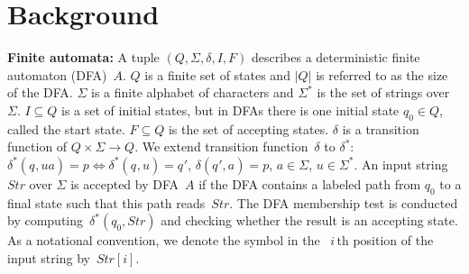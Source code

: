 \documentclass[10pt, conference, compsocconf]{IEEEtran}
\newcommand\STR{\textit{Str}}
\newcommand\State[1][{}]{\ensuremath{q_{#1}}}
\newcommand\StateSets{\ensuremath{Q}}
\newcommand\StartState{\ensuremath{\State[0]}}
\newcommand\NrStates{\ensuremath{\lvert\StateSets\rvert}}
\newcommand\TF{\ensuremath{\delta}}
\newcommand\TFE{\ensuremath{\TF^*}}
\begin{document}
\section{Background}
\label{sec:background}
{\bf Finite automata:} A tuple $(\StateSets, \Sigma, \TF, \ensuremath{I}, F)$ describes a
deterministic finite automaton (DFA)~$A$. $\StateSets$ is a finite set of
states and $\NrStates$ is
referred to as the size of the DFA. $\Sigma$ is a finite alphabet of
characters and
$\Sigma^*$ is the set of strings over $\Sigma$.
$\ensuremath{I}\subseteq\StateSets$ is a set of initial states, but
in DFAs there is one initial state $\StartState\in\StateSets$, called
the start state.
$F \subseteq
\StateSets$ is the set of accepting states.
$\TF$ is a transition function of $\StateSets
\times \Sigma \to \StateSets$.
We extend transition function~$\TF$ to $\TFE$:
$\TFE(\State, ua)=p\Leftrightarrow\TFE(\State,u)=\State'$,
$\TF(\State',a)=p$, $a\in\Sigma$, $u\in\Sigma^*$.
An input string~$\STR$ over $\Sigma$ is accepted by DFA~$A$ if the DFA contains a labeled
path from $\StartState$ to a final state such that this path reads~$\STR$.
The DFA membership test is conducted by
computing~$\TFE(\State[0],\STR)$ and checking whether the result
is an accepting state.
As a notational convention, we denote the symbol
in the ~$i\,$th position of the input string by~$\STR[i]$.
\end{document}
